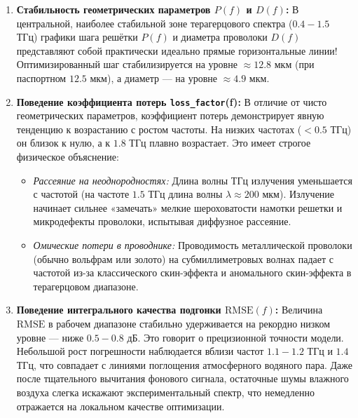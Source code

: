 \begin{enumerate}
    \item \textbf{Стабильность геометрических параметров $P(f)$ и $D(f)$:}
    В центральной, наиболее стабильной зоне терагерцового спектра ($0.4 - 1.5$ ТГц) графики шага решётки $P(f)$ и диаметра проволоки $D(f)$ представляют собой практически идеально прямые горизонтальные линии! Оптимизированный шаг стабилизируется на уровне $\approx 12.8$ мкм (при паспортном $12.5$ мкм), а диаметр — на уровне $\approx 4.9$ мкм. 
    
    
    \item \textbf{Поведение коэффициента потерь \texttt{loss\_factor}(f):}
    В отличие от чисто геометрических параметров, коэффициент потерь демонстрирует явную тенденцию к возрастанию с ростом частоты. На низких частотах ($< 0.5$ ТГц) он близок к нулю, а к $1.8$ ТГц плавно возрастает. Это имеет строгое физическое объяснение:
    \begin{itemize}
        \item \textit{Рассеяние на неоднородностях:} Длина волны ТГц излучения уменьшается с частотой (на частоте $1.5$ ТГц длина волны $\lambda \approx 200$ мкм). Излучение начинает сильнее «замечать» мелкие шероховатости намотки решетки и микродефекты проволоки, испытывая диффузное рассеяние.
        \item \textit{Омические потери в проводнике:} Проводимость металлической проволоки (обычно вольфрам или золото) на субмиллиметровых волнах падает с частотой из-за классического скин-эффекта и аномального скин-эффекта в терагерцовом диапазоне.
    \end{itemize}
    
    \item \textbf{Поведение интегрального качества подгонки $\text{RMSE}(f)$:}
    Величина $\text{RMSE}$ в рабочем диапазоне стабильно удерживается на рекордно низком уровне — ниже $0.5 - 0.8$ дБ. Это говорит о прецизионной точности модели. Небольшой рост погрешности наблюдается вблизи частот $1.1 - 1.2$ ТГц и $1.4$ ТГц, что совпадает с линиями поглощения атмосферного водяного пара. Даже после тщательного вычитания фонового сигнала, остаточные шумы влажного воздуха слегка искажают экспериментальный спектр, что немедленно отражается на локальном качестве оптимизации.
\end{enumerate}

